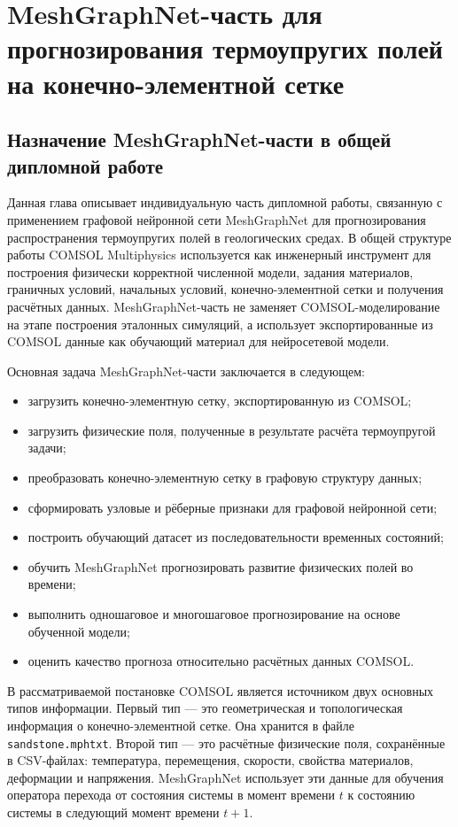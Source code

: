 \chapter{MeshGraphNet-часть для прогнозирования термоупругих полей на конечно-элементной сетке}

\section{Назначение MeshGraphNet-части в общей дипломной работе}

Данная глава описывает индивидуальную часть дипломной работы, связанную с применением графовой нейронной сети MeshGraphNet для прогнозирования распространения термоупругих полей в геологических средах. В общей структуре работы COMSOL Multiphysics используется как инженерный инструмент для построения физически корректной численной модели, задания материалов, граничных условий, начальных условий, конечно-элементной сетки и получения расчётных данных. MeshGraphNet-часть не заменяет COMSOL-моделирование на этапе построения эталонных симуляций, а использует экспортированные из COMSOL данные как обучающий материал для нейросетевой модели.

Основная задача MeshGraphNet-части заключается в следующем:
\begin{itemize}
    \item загрузить конечно-элементную сетку, экспортированную из COMSOL;
    \item загрузить физические поля, полученные в результате расчёта термоупругой задачи;
    \item преобразовать конечно-элементную сетку в графовую структуру данных;
    \item сформировать узловые и рёберные признаки для графовой нейронной сети;
    \item построить обучающий датасет из последовательности временных состояний;
    \item обучить MeshGraphNet прогнозировать развитие физических полей во времени;
    \item выполнить одношаговое и многошаговое прогнозирование на основе обученной модели;
    \item оценить качество прогноза относительно расчётных данных COMSOL.
\end{itemize}

В рассматриваемой постановке COMSOL является источником двух основных типов информации. Первый тип --- это геометрическая и топологическая информация о конечно-элементной сетке. Она хранится в файле \texttt{sandstone.mphtxt}. Второй тип --- это расчётные физические поля, сохранённые в CSV-файлах: температура, перемещения, скорости, свойства материалов, деформации и напряжения. MeshGraphNet использует эти данные для обучения оператора перехода от состояния системы в момент времени $t$ к состоянию системы в следующий момент времени $t+1$.

